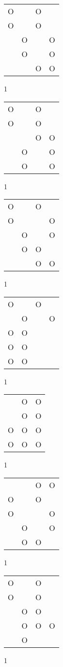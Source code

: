 \begin{tabular}{|m{0.2cm}m{0.2cm}m{0.2cm}m{0.2cm}|}\hline
O& &O& \\
O& &O& \\
 &O& &O\\
 &O& &O\\
 & &O&O\\
\hline\end{tabular}1
\begin{tabular}{|m{0.2cm}m{0.2cm}m{0.2cm}m{0.2cm}|}\hline
O& &O& \\
O& &O& \\
 & &O&O\\
 &O& &O\\
 &O& &O\\
\hline\end{tabular}1
\begin{tabular}{|m{0.2cm}m{0.2cm}m{0.2cm}m{0.2cm}|}\hline
O& &O& \\
O& & &O\\
 &O& &O\\
 &O&O& \\
 & &O&O\\
\hline\end{tabular}1
\begin{tabular}{|m{0.2cm}m{0.2cm}m{0.2cm}m{0.2cm}|}\hline
O& &O& \\
 &O& &O\\
O&O& & \\
O&O& & \\
O&O& & \\
\hline\end{tabular}1
\begin{tabular}{|m{0.2cm}m{0.2cm}m{0.2cm}|}\hline
 &O&O\\
 &O&O\\
O&O&O\\
O&O&O\\
\hline\end{tabular}1
\begin{tabular}{|m{0.2cm}m{0.2cm}m{0.2cm}m{0.2cm}|}\hline
 & &O&O\\
O& &O& \\
O& & &O\\
 &O& &O\\
 &O&O& \\
\hline\end{tabular}1
\begin{tabular}{|m{0.2cm}m{0.2cm}m{0.2cm}m{0.2cm}|}\hline
O& &O& \\
O& &O& \\
 &O&O& \\
 &O&O&O\\
 &O& & \\
\hline\end{tabular}1
